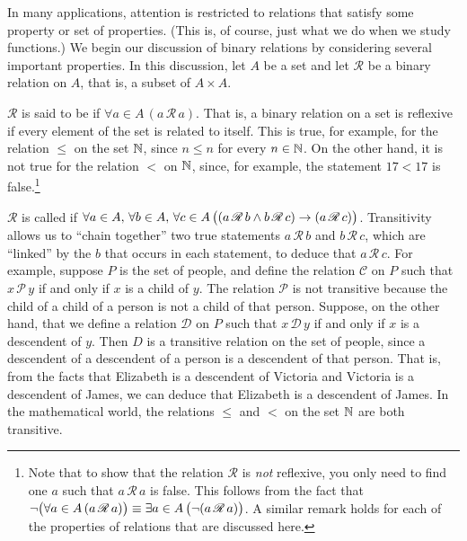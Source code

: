 \medbreak

In many applications, attention is restricted to relations that
satisfy some property or set of properties.  (This is, of course,
just what we do when we study functions.)  We begin our discussion
of binary relations by considering several important properties.
In this discussion, let $A$ be a set and let ${\mathscr R}$
be a binary relation on $A$, that is, a subset of $A\times A$.

$\mathscr R$ is said to be  if
$\forall a\in A\,(a \,{\mathscr R}\, a)$.  That is, a binary relation
on a set is reflexive if every element of the set is related
to itself.  This is true, for example, for the relation $\le$ 
on the set ${\mathbb N}$, since $n\le n$ for every $n\in{\mathbb N}$.  On the other
hand, it is not true for the relation $<$ on ${\mathbb N}$, since, for
example, the statement $17<17$ is false.\footnote{Note that to show
that the relation ${\mathscr R}$ is \emph{not} reflexive, you only need to
find one $a$ such that $a\,{\mathscr R}\,a$ is false.  This
follows from the fact that $\lnot\big(\forall a\in A\,(a \,{\mathscr R}\, a)\big)
\equiv \exists a\in A\,\big(\lnot(a \,{\mathscr R}\, a)\big)$.
A similar remark holds for each of the properties of relations
that are discussed here.}

$\mathscr R$ is called  if
$\forall a\in A,\,\forall b\in A,\,\forall c\in A\,
\big((a\,{\mathscr R}\,b \wedge b\,{\mathscr R}\,c)\rightarrow (a\,{\mathscr R}\,c)\big)$.
Transitivity allows us to ``chain together'' two true
statements $a\,{\mathscr R}\,b$ and $b\,{\mathscr R}\,c$,
which are ``linked'' by the $b$ that occurs in each statement, to
deduce that $a\,{\mathscr R}\,c$.  For example, suppose
$P$ is the set of people, and define the relation ${\mathscr C}$
on $P$ such that $x\,{\mathscr P}\,y$ if and only if $x$ is a
child of $y$.  The relation ${\mathscr P}$ is not transitive
because the child of a child of a person is not a child of
that person.  Suppose, on the other hand, that we define
a relation ${\mathscr D}$ on $P$ such that $x\,{\mathscr D}\,y$
if and only if $x$ is a descendent of $y$.  Then $D$ is a
transitive relation on the set of people, since a descendent of
a descendent of a person is a descendent of that person.
That is, from the facts that Elizabeth is a descendent of Victoria
and Victoria is a descendent of James, we can deduce that
Elizabeth is a descendent of James.  In the mathematical world,
the relations $\le$ and $<$ on the set ${\mathbb N}$ are both transitive.

